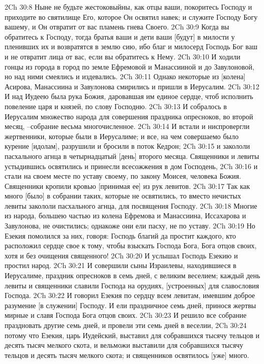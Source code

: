 2Ch 30:8  Ныне не будьте жестоковыйны, как отцы ваши, покоритесь Господу и приходите во святилище Его, которое Он освятил навек; и служите Господу Богу вашему, и Он отвратит от вас пламень гнева Своего.
2Ch 30:9  Когда вы обратитесь к Господу, тогда братья ваши и дети ваши [будут] в милости у пленивших их и возвратятся в землю сию, ибо благ и милосерд Господь Бог ваш и не отвратит лица от вас, если вы обратитесь к Нему.
2Ch 30:10  И ходили гонцы из города в город по земле Ефремовой и Манассииной и до Завулоновой, но над ними смеялись и издевались.
2Ch 30:11  Однако некоторые из [колена] Асирова, Манассиина и Завулонова смирились и пришли в Иерусалим.
2Ch 30:12  И над Иудеею была рука Божия, даровавшая им единое сердце, чтоб исполнить повеление царя и князей, по слову Господню.
2Ch 30:13  И собралось в Иерусалим множество народа для совершения праздника опресноков, во второй месяц, --собрание весьма многочисленное.
2Ch 30:14  И встали и ниспровергли жертвенники, которые были в Иерусалиме; и все, на чем совершаемо было курение [идолам], разрушили и бросили в поток Кедрон;
2Ch 30:15  и закололи пасхального агнца в четырнадцатый [день] второго месяца. Священники и левиты устыдившись освятились и принесли всесожжения в дом Господень,
2Ch 30:16  и стали на своем месте по уставу своему, по закону Моисея, человека Божия. Священники кропили кровью [принимая ее] из рук левитов.
2Ch 30:17  Так как много [было] в собрании таких, которые не освятились, то вместо нечистых левиты закололи пасхального агнца, для посвящения Господу.
2Ch 30:18  Многие из народа, большею частью из колена Ефремова и Манассиина, Иссахарова и Завулонова, не очистились; однакоже они ели пасху, не по уставу.
2Ch 30:19  Но Езекия помолился за них, говоря: Господь благий да простит каждого, кто расположил сердце свое к тому, чтобы взыскать Господа Бога, Бога отцов своих, хотя и без очищения священного!
2Ch 30:20  И услышал Господь Езекию и простил народ.
2Ch 30:21  И совершили сыны Израилевы, находившиеся в Иерусалиме, праздник опресноков в семь дней, с великим веселием; каждый день левиты и священники славили Господа на орудиях, [устроенных] для славословия Господа.
2Ch 30:22  И говорил Езекия по сердцу всем левитам, имевшим доброе разумение [в служении] Господу. И ели праздничное семь дней, принося жертвы мирные и славя Господа Бога отцов своих.
2Ch 30:23  И решило все собрание праздновать другие семь дней, и провели эти семь дней в веселии,
2Ch 30:24  потому что Езекия, царь Иудейский, выставил для собравшихся тысячу тельцов и десять тысяч мелкого скота, и вельможи выставили для собравшихся тысячу тельцов и десять тысяч мелкого скота; и священников освятилось [уже] много.
